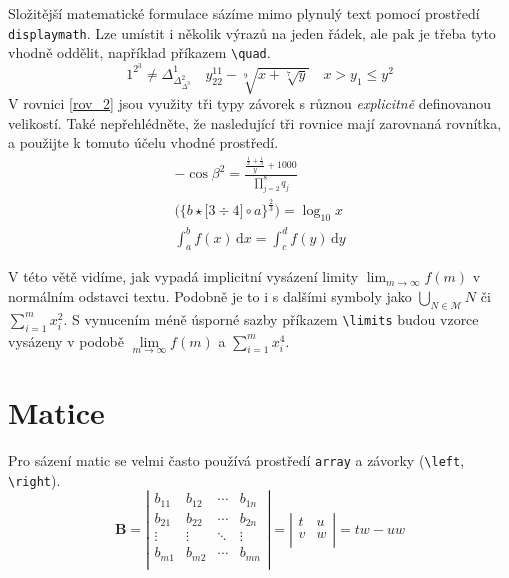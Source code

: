 \documentclass[a4paper, twocolumn, 11pt]{article}
\theoremstyle{definition}
\theoremstyle{definition}
\begin{document}
    Složitější matematické formulace sázíme mimo plynulý text pomocí prostředí \verb|displaymath|.
    Lze umístit i několik výrazů na jeden řádek, ale pak je třeba tyto vhodně oddělit, například příkazem \verb|\quad|.
    $$1^{2^3} \neq \Delta_{\Delta_{\Delta^3}^2}^1 \quad y_{22}^{11} - \sqrt[9]{x + \sqrt[7]{y}} \quad x > y_1 \leq y^2$$
    V rovnici \eqref{rov_2} jsou využity tři typy závorek s různou \emph{explicitně} definovanou velikostí. 
    Také nepřehlédněte, že nasledující tři rovnice mají zarovnaná rovnítka, a použijte k tomuto účelu vhodné prostředí.
    \begin{eqnarray}
        -\cos{\beta}^2 = \frac{\frac{\frac{1}{x} + \frac{1}{3}}{y} + 1000}{\prod\limits _{j=2}^8 q_j}\\
        \bigg(\Big\{b \star \big[3 \div 4 \big] \circ a \Big\}^{\frac{2}{3}} \bigg) = \log_{10} x\label{rov_2}\\
        \int_a^b f(x)\, \mathrm{d}x = \int_c^d f(y)\, \mathrm{d}y \label{rov_3}
    \end{eqnarray}

    V této větě vidíme, jak vypadá implicitní vysázení limity $\lim_{m\to\infty} f(m)$ v normálním odstavci textu.
    Podobně je to i s dalšími symboly jako $\bigcup_{N\in\mathcal{M}} N$ či $\sum_{i=1}^m x_{i}^2$.
    S vynucením méně úsporné sazby příkazem \verb|\limits| budou vzorce vysázeny v podobě 
    $\lim\limits _{m\to\infty} f(m)$ a $\sum\limits _{i=1}^m x_{i}^4$.

    \section{Matice}

    Pro sázení matic se velmi často používá prostředí \verb|array| a závorky (\verb|\left|, \verb|\right|).
    $$
        \mathbf{B} = 
        \left|
            \begin{array}{cccc}
                b_{11} & b_{12} & \cdots & b_{1n}\\
                b_{21} & b_{22} & \cdots & b_{2n}\\
                \vdots & \vdots & \ddots & \vdots\\
                b_{m1} & b_{m2} & \cdots & b_{mn}\\
            \end{array}
        \right| =
        \left|
            \begin{array}{cc}
                t & u\\
                v & w\\
            \end{array}
        \right| = tw - uw
    $$
\end{document}
